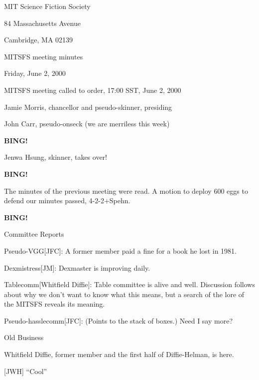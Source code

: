 \documentclass[12pt]{article}
\begin{document}
\begin{center}

MIT Science Fiction Society 

84 Massachusetts Avenue

Cambridge, MA 02139

\vspace{12pt}

MITSFS meeting minutes

Friday, June 2, 2000

\end{center}
 
\vspace{18pt}

\setlength{\parskip}{6pt}

\noindent
MITSFS meeting called to order, 17:00 SST, June 2, 2000

Jamie Morris, chancellor and pseudo-skinner, presiding

John Carr, pseudo-onseck (we are merriless this week)

{\bf BING!}

Jenwa Hsung, skinner, takes over!

{\bf BING!}

\vskip 12pt

The minutes of the previous meeting were read.  A motion to deploy
600 eggs to defend our minutes passed, 4-2-2+Spehn.

{\bf BING!}

\vskip 12pt

\centerline{Committee Reports}

Pseudo-VGG[JFC]: A former member paid a fine for a book he lost in 1981.

Dexmistress[JM]: Dexmaster is improving daily.

Tablecomm[Whitfield Diffie]: Table committee is alive and well.
Discussion follows about why we don't want to know what this means,
but a search of the lore of the MITSFS reveals its meaning.

Pseudo-hasslecomm[JFC]: (Points to the stack of boxes.) Need I say more?


\vskip 12pt

\centerline{Old Business}

\vskip 12pt

Whitfield Diffie, former member and the first half of Diffie-Helman,
is here.

[JWH] ``Cool''

\vskip 12pt
\end{document}

